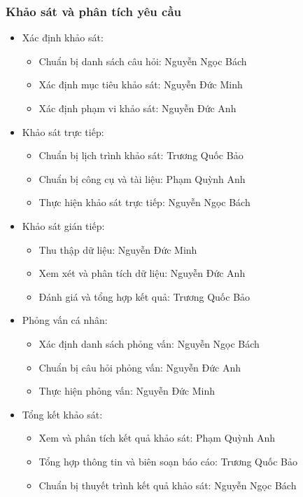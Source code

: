 \documentclass[12pt]{article}
\begin{document}
\subsubsection{Khảo sát và phân tích yêu cầu}
\begin{itemize}[label=-, leftmargin=1cm]
    \item Xác định khảo sát:
    \begin{itemize}[label=+, leftmargin=1cm]
        \item Chuẩn bị danh sách câu hỏi: Nguyễn Ngọc Bách
        \item Xác định mục tiêu khảo sát: Nguyễn Đức Minh
        \item Xác định phạm vi khảo sát: Nguyễn Đức Anh
    \end{itemize}
    \item Khảo sát trực tiếp:
    \begin{itemize}[label=+, leftmargin=1cm]
        \item Chuẩn bị lịch trình khảo sát: Trương Quốc Bảo
        \item Chuẩn bị công cụ và tài liệu: Phạm Quỳnh Anh
        \item Thực hiện khảo sát trực tiếp: Nguyễn Ngọc Bách
    \end{itemize}
    \item Khảo sát gián tiếp:
    \begin{itemize}[label=+, leftmargin=1cm]
        \item Thu thập dữ liệu: Nguyễn Đức Minh
        \item Xem xét và phân tích dữ liệu: Nguyễn Đức Anh
        \item Đánh giá và tổng hợp kết quả: Trương Quốc Bảo
    \end{itemize}
    \item Phỏng vấn cá nhân:
    \begin{itemize}[label=+, leftmargin=1cm]
        \item Xác định danh sách phỏng vấn: Nguyễn Ngọc Bách
        \item Chuẩn bị câu hỏi phỏng vấn: Nguyễn Đức Anh
        \item Thực hiện phỏng vấn: Nguyễn Đức Minh
    \end{itemize}
    \item Tổng kết khảo sát:
    \begin{itemize}[label=+, leftmargin=1cm]
        \item Xem và phân tích kết quả khảo sát: Phạm Quỳnh Anh
        \item Tổng hợp thông tin và biên soạn báo cáo: Trương Quốc Bảo
        \item Chuẩn bị thuyết trình kết quả khảo sát: Nguyễn Ngọc Bách
    \end{itemize}
\end{itemize}
\end{document}
